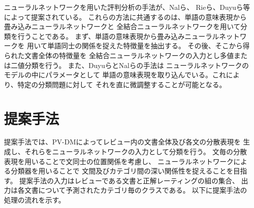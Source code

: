 \documentclass[twocolumn,a4paper]{ltjarticle}
\begin{document}
ニューラルネットワークを用いた評判分析の手法が、Nalら\cite{nal14}、
Rieら\cite{rie14}、Duyuら\cite{duyu15}等によって提案されている。
これらの方法に共通するのは、単語の意味表現から畳み込みニューラルネットワークと
全結合ニューラルネットワークを用いて分類を行うことである。
まず、単語の意味表現から畳み込みニューラルネットワークを
用いて単語同士の関係を捉えた特徴量を抽出する。
その後、そこから得られた文書全体の特徴量を
全結合ニューラルネットワークの入力とし多値または二値分類を行う。
また、Duyuら\cite{duyu15}とNalら\cite{nal14}の手法は
ニューラルネットワークのモデルの中にパラメータとして
単語の意味表現を取り込んでいる。これにより、特定の分類問題に対して
それを直に微調整することが可能となる。



\section{提案手法}

提案手法では、PV-DMによってレビュー内の文書全体及び各文の分散表現を
生成し、それらをニューラルネットワークの入力として分類を行う。
文毎の分散表現を用いることで文同士の位置関係を考慮し、
ニューラルネットワークによる分類器を用いることで
文間及びカテゴリ間の深い関係性を捉えることを目指す。
提案手法の入力はレビューである文書と正解レーティングの組の集合、
出力は各文書について予測されたカテゴリ毎のクラスである。
以下に提案手法の処理の流れを示す。
\end{document}
